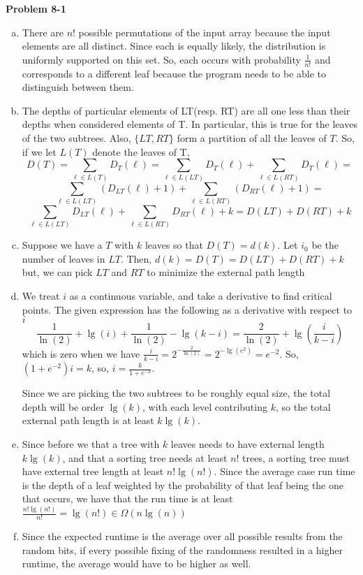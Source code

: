 \documentclass{article}
\begin{document}
\noindent\textbf{Problem 8-1}\\
\begin{enumerate}[a.]
\item
There are $n!$ possible permutations of the input array because the input elements are all distinct. Since each is equally likely, the distribution is uniformly supported on this set. So, each occurs with probability $\frac{1}{n!}$ and corresponds to a different leaf because the program needs to be able to distinguish between them.

\item
The depths of particular elements of LT(resp. RT) are all one less than their depths when considered elements of T. In particular, this is true for the leaves of the two subtrees. Also, $\{LT,RT\}$ form a partition of all the leaves of $T$. So, if we let $L(T)$ denote the leaves of T,
\[
D(T) =\sum_{\ell \in L(T)} D_T(\ell) = \sum_{\ell \in L(LT)} D_T(\ell) + \sum_{\ell \in L(RT)} D_T(\ell) =\]\[\sum_{\ell \in L(LT)} (D_{LT}(\ell)+1) +\sum_{\ell \in L(RT)} (D_{RT}(\ell) +1) =\]\[ \sum_{\ell \in L(LT)} D_{LT}(\ell) + \sum_{\ell \in L(RT)} D_{RT}(\ell) + k = D(LT)+D(RT)+k
\]

\item
Suppose we have a $T$ with $k$ leaves so that $D(T) =d(k)$. Let $i_0$ be the number of leaves in $LT$. Then, $d(k) = D(T) = D(LT)+D(RT)+k$ but, we can pick $LT$ and $RT$ to minimize the external path length

\item

We treat $i$ as a continuous variable, and take a derivative to find critical points. The given expression has the following as a derivative with respect to $i$
\[
\frac{1}{\ln(2)}+\lg(i) + \frac{1}{\ln(2)} - \lg(k-i) = \frac{2}{\ln(2)} + \lg\left(\frac{i}{k-i}\right)
\]
which is zero when we have $\frac{i}{k-i} = 2^{-\frac{2}{\ln(2)}} = 2^{-\lg(e^2)} = e^{-2}$. So, $(1+e^{-2})i = k$, so, $i = \frac{k}{1+e^{-2}}$. 

Since we are picking the two subtrees to be roughly equal size, the total depth will be order $\lg(k)$, with each level contributing $k$, so the total external path length is at least $k\lg(k)$.
\item

Since before we that a tree with $k$ leaves needs to have external length $k\lg(k)$, and that a sorting tree needs at least $n!$ trees, a sorting tree must have external tree length at least $n!\lg(n!)$. Since the average case run time is the depth of a leaf weighted by the probability of that leaf being the one that occurs, we have that the run time is at least $\frac{n!\lg(n!)}{n!} =\lg(n!) \in \Omega(n\lg(n))$


\item
Since the expected runtime is the average over all possible results from the random bits, if every possible fixing of the randomness resulted in a higher runtime, the average would have to be higher as well.


\end{enumerate}
\end{document}
